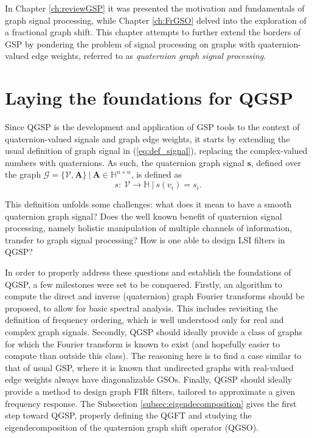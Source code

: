In Chapter \ref{ch:reviewGSP} it was presented the motivation and fundamentals of graph signal processing, while Chapter \ref{ch:FrGSO} delved into the exploration of a fractional graph shift.
This chapter attempts to further extend the borders of GSP by pondering the problem of signal processing on graphs with quaternion-valued edge weights, referred to as \textit{quaternion graph signal processing}.

\section{Laying the foundations for QGSP}

Since QGSP is the development and application of GSP tools to the context of quaternion-valued signals and graph edge weights, it starts by extending the usual definition of graph signal in (\ref{eq:def_signal}), replacing the complex-valued numbers with quaternions. As such, the quaternion graph signal $\mathbf{s}$, defined over the graph $\mathcal{G} = \{\mathcal{V}, \mathbf{A}\}  \ | \ \mathbf{A} \in \mathbb{H}^{n \times n}$, is defined as
\begin{equation}\label{eq:qgsp_defs}
    s: \ \mathcal{V} \rightarrow \mathbb{H} \ | \ s(v_i) = s_i.
\end{equation}

This definition unfolds some challenges: what does it
mean to have a smooth quaternion graph signal? Does the well known benefit of quaternion signal processing, namely holistic manipulation of multiple channels of information, transfer to graph signal processing? How is one able to design LSI filters in QGSP?

In order to properly address these questions and establish the foundations of QGSP, a few milestones were set to be conquered. Firstly, an algorithm to compute the direct and inverse (quaternion) graph Fourier transforms should be proposed, to allow for basic spectral analysis. This includes revisiting the definition of frequency ordering, which is well understood only for real and complex graph signals. Secondly, QGSP should ideally provide a class of graphs for which the Fourier transform is known to exist (and hopefully easier to compute than outside this class). The reasoning here is to find a case similar to that of usual GSP, where it is known that undirected graphs with real-valued edge weights always have diagonalizable GSOs. Finally, QGSP should ideally provide a method to design graph FIR filters, tailored to approximate a given frequency response. The Subsection \ref{subsec:eigendecomposition} gives the first step toward QGSP, properly defining the QGFT and studying the eigendecomposition of the quaternion graph shift operator (QGSO).

